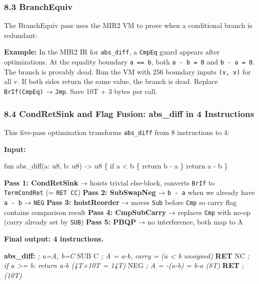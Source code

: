 \documentclass[
  11pt,
  a4paper,
]{report}
\newenvironment{Shaded}{\begin{snugshade}\small}{\end{snugshade}}
\newcommand{\BuiltInTok}[1]{#1}
\newcommand{\CommentTok}[1]{\textcolor[rgb]{0.56,0.35,0.01}{\textit{#1}}}
\newcommand{\ControlFlowTok}[1]{\textcolor[rgb]{0.13,0.29,0.53}{\textbf{#1}}}
\newcommand{\FunctionTok}[1]{\textcolor[rgb]{0.13,0.29,0.53}{\textbf{#1}}}
\newcommand{\NormalTok}[1]{#1}
\begin{document}
\subsubsection{8.3 BranchEquiv}\label{branchequiv}

The BranchEquiv pass uses the MIR2 VM to prove when a conditional branch
is redundant:

\textbf{Example:} In the MIR2 IR for \texttt{abs\_diff}, a
\texttt{CmpEq} guard appears after optimizations. At the equality
boundary \texttt{a\ ==\ b}, both \texttt{a\ -\ b\ =\ 0} and
\texttt{b\ -\ a\ =\ 0}. The branch is provably dead. Run the VM with 256
boundary inputs \texttt{(v,\ v)} for all v. If both sides return the
same value, the branch is dead. Replace \texttt{BrIf(CmpEq)} →
\texttt{Jmp}. Save 10T + 3 bytes per call.

\subsubsection{8.4 CondRetSink and Flag Fusion: abs\_diff in 4
Instructions}\label{condretsink-and-flag-fusion-abs_diff-in-4-instructions}

This five-pass optimization transforms \texttt{abs\_diff} from 8
instructions to 4:

\textbf{Input:}

\begin{Shaded}
\begin{Highlighting}[]
\NormalTok{fun abs\_diff(a: u8, b: u8) {-}\textgreater{} u8 \{}
\NormalTok{    if a \textless{} b \{ return b {-} a \}}
\NormalTok{    return a {-} b}
\NormalTok{\}}
\end{Highlighting}
\end{Shaded}

\textbf{Pass 1: CondRetSink} → hoists trivial else-block, converts
\texttt{BrIf} to \texttt{TermCondRet} (= \texttt{RET\ CC}) \textbf{Pass
2: SubSwapNeg} → \texttt{b\ -\ a} when we already have \texttt{a\ -\ b}
→ \texttt{NEG} \textbf{Pass 3: hoistReorder} → moves \texttt{Sub} before
\texttt{Cmp} so carry flag contains comparison result \textbf{Pass 4:
CmpSubCarry} → replaces \texttt{Cmp} with no-op (carry already set by
\texttt{SUB}) \textbf{Pass 5: PBQP} → no interference, both map to A

\textbf{Final output: 4 instructions.}

\begin{Shaded}
\begin{Highlighting}[]
\FunctionTok{abs\_diff:}   \CommentTok{; a=A, b=C}
    \BuiltInTok{SUB}\NormalTok{ C       }\CommentTok{; A = a{-}b, carry = (a \textless{} b unsigned)}
    \ControlFlowTok{RET}\NormalTok{ NC      }\CommentTok{; if a \textgreater{}= b: return a{-}b (4T+10T = 14T)}
    \BuiltInTok{NEG}         \CommentTok{; A = {-}(a{-}b) = b{-}a  (8T)}
    \ControlFlowTok{RET}         \CommentTok{; (10T)}
\end{Highlighting}
\end{Shaded}
\end{document}
